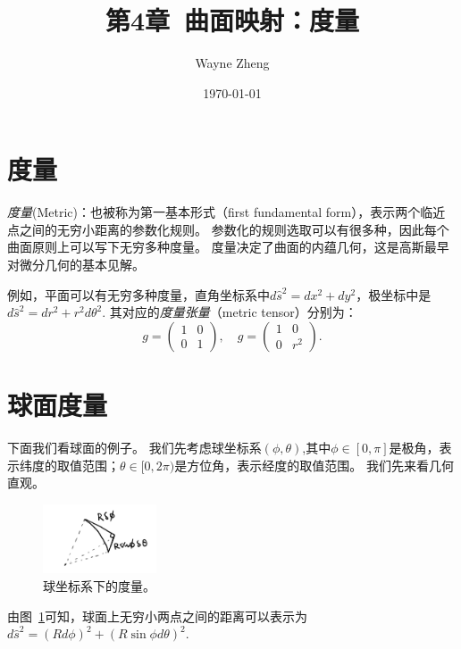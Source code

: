 \documentclass{article}
\title{第4章~曲面映射：度量}
\author{Wayne Zheng}
\date{\today}
\begin{document}
\maketitle

\section{度量}

\emph{度量}(Metric)：也被称为第一基本形式（first fundamental form），表示两个临近点之间的无穷小距离的参数化规则。
参数化的规则选取可以有很多种，因此每个曲面原则上可以写下无穷多种度量。
度量决定了曲面的内蕴几何，这是高斯最早对微分几何的基本见解。

例如，平面可以有无穷多种度量，直角坐标系中$d\hat{s}^{2}=dx^{2}+dy^{2}$，极坐标中是$d\hat{s}^{2}=dr^{2}+r^{2}d\theta^{2}$.
其对应的\emph{度量张量}（metric tensor）分别为：
\begin{equation}
g=
\begin{pmatrix}
1 & 0 \\
0 & 1
\end{pmatrix}, \quad
g=
\begin{pmatrix}
1 & 0 \\
0 & r^{2}
\end{pmatrix}.
\end{equation}

\section{球面度量}

下面我们看球面的例子。
我们先考虑球坐标系$(\phi, \theta)$,其中$\phi\in[0, \pi]$是极角，表示纬度的取值范围；$\theta\in[0, 2\pi)$是方位角，表示经度的取值范围。
我们先来看几何直观。

\begin{figure}[htbp]
    \centering %
    \includegraphics[width=0.3\textwidth]{../figs/chap4_01.jpg} %
    \caption{球坐标系下的度量。} 
    \label{fig:chap4_01} 
\end{figure}

由图~\ref{fig:chap4_01}可知，球面上无穷小两点之间的距离可以表示为$d\hat{s}^{2}=\left(Rd\phi\right)^{2}+\left(R\sin\phi{d}\theta\right)^{2}$.
\end{document}
